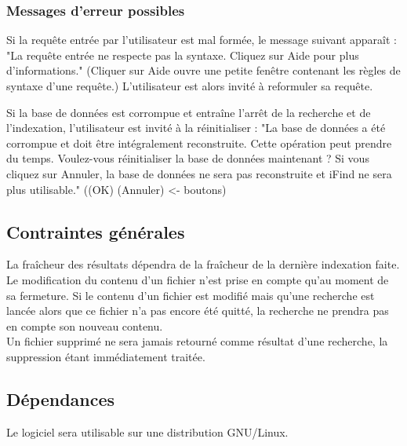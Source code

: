 \documentclass[a4paper,10pt]{article}
\begin{document}
\subsubsection{Messages d'erreur possibles}
Si la requête entrée par l'utilisateur est mal formée, le message suivant apparaît :
"La requête entrée ne respecte pas la syntaxe. Cliquez sur Aide pour plus d'informations."
(Cliquer sur Aide ouvre une petite fenêtre contenant les règles de syntaxe d'une requête.)
L'utilisateur est alors invité à reformuler sa requête.

Si la base de données est corrompue et entraîne l'arrêt de la recherche et de l'indexation, l'utilisateur est invité à la réinitialiser :
"La base de données a été corrompue et doit être intégralement reconstruite. 
Cette opération peut prendre du temps. Voulez-vous réinitialiser la base de données maintenant ?
Si vous cliquez sur Annuler, la base de données ne sera pas reconstruite et iFind ne sera plus utilisable."
((OK) (Annuler) <- boutons)

\subsection{Contraintes générales}
La fraîcheur des résultats dépendra de la fraîcheur de la dernière indexation faite.\\
Le modification du contenu d'un fichier n'est prise en compte qu'au moment de sa
fermeture. Si le contenu d'un fichier est modifié mais qu'une recherche est
lancée alors que ce fichier n'a pas encore été quitté, la recherche ne prendra
pas en compte son nouveau contenu.\\
Un fichier supprimé ne sera jamais retourné comme résultat d'une recherche, la
suppression étant immédiatement traitée.


\subsection{Dépendances}
Le logiciel sera utilisable sur une distribution GNU/Linux.

\newpage
\end{document}
